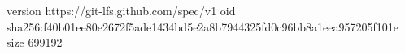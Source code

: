 version https://git-lfs.github.com/spec/v1
oid sha256:f40b01ee80e2672f5ade1434bd5e2a8b7944325fd0c96bb8a1eea957205f101e
size 699192
